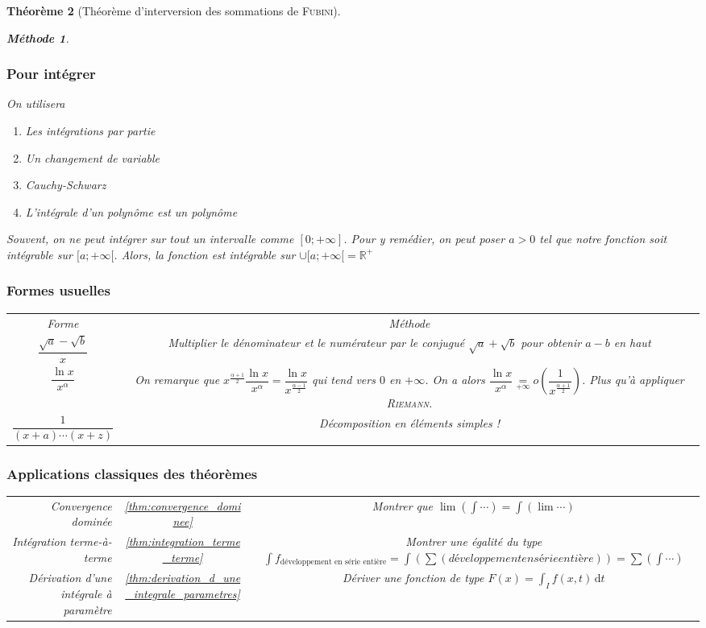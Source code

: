 \documentclass[11pt,a4paper]{report}
\newtheorem{theorem}{Théorème}[chapter]
\theoremstyle{definition}
\newtheorem{methode}[theorem]{Méthode}
\begin{document}
\begin{theorem}[Théorème d'interversion des sommations de \textsc{Fubini}]
\begin{methode}
\subsubsection*{Pour intégrer}
On utilisera
\begin{enumerate}
	\item Les intégrations par partie
	\item Un changement de variable
	\item Cauchy-Schwarz
	\item L'intégrale d'un polynôme est un polynôme
\end{enumerate}
Souvent, on ne peut intégrer sur tout un intervalle comme $[0;+\infty ]$. Pour y remédier, on peut poser $a>0$ tel que notre fonction soit intégrable sur $[a;+ \infty [$. Alors, la fonction est intégrable sur $\cup [a;+\infty [ = \ensuremath{\mathbb{R}}^+$
\subsubsection*{Formes usuelles}
\begin{tabulary}{\textwidth}{| c | C |}
     \emph{Forme} & \emph{Méthode} \\
     $\dfrac{\sqrt{a} - \sqrt{b}}{x}$ & Multiplier le dénominateur et le numérateur par le conjugué $\sqrt{a}+\sqrt{b}$ pour obtenir $a-b$ en haut \\
     $\dfrac{\ln x}{x^\alpha}$ & On remarque que $x^{\frac{\alpha + 1}{2}}\dfrac{\ln x}{x^\alpha} = \dfrac{\ln x}{x^{\frac{\alpha - 1}{2}}}$ qui tend vers $0$ en $+\infty$. On a alors $\dfrac{\ln x}{x^\alpha}\underset{+\infty}{=}o \left( \dfrac{1}{x^{\frac{\alpha + 1}{2}}} \right) $. Plus qu'à appliquer \textsc{Riemann}. \\
     $\dfrac{1}{(x+a)\cdots(x+z)}$&Décomposition en éléments simples !\\
\end{tabulary}
\subsubsection*{Applications classiques des théorèmes}
\begin{tabulary}{\textwidth}{| r@{ - (} c @{) }| C |}
     Convergence dominée&\ref{thm:convergence_dominee}&Montrer que $\lim\left( \int \cdots\right) = \int \left( \lim \cdots\right) $\\
     \small{Intégration terme-à-terme}&\ref{thm:integration_terme_terme}&Montrer une égalité du type $\int f_\text{développement en série entière} = \int \left( \sum (développement en série entière) \right) = \sum \left( \int \cdots \right)$\\
     \small{Dérivation d'une intégrale à paramètre}&\ref{thm:derivation_d_une_integrale_parametres}&Dériver une fonction de type $F(x)=\int_I f(x,t)\,\mathrm{d} t$
\end{tabulary}
\end{methode}

\end{theorem}
\end{document}
